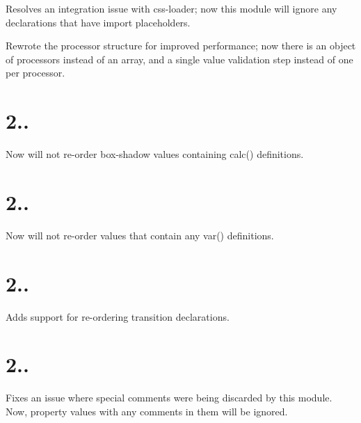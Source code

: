 
\begin{DoxyItemize}
\item Resolves an integration issue with css-\/loader; now this module will ignore any declarations that have import placeholders.
\item Rewrote the processor structure for improved performance; now there is an object of processors instead of an array, and a single value validation step instead of one per processor.
\end{DoxyItemize}

\section*{2..}


\begin{DoxyItemize}
\item Now will not re-\/order box-\/shadow values containing {\ttfamily calc()} definitions.
\end{DoxyItemize}

\section*{2..}


\begin{DoxyItemize}
\item Now will not re-\/order values that contain any {\ttfamily var()} definitions.
\end{DoxyItemize}

\section*{2..}


\begin{DoxyItemize}
\item Adds support for re-\/ordering {\ttfamily transition} declarations.
\end{DoxyItemize}

\section*{2..}


\begin{DoxyItemize}
\item Fixes an issue where special comments were being discarded by this module. Now, property values with any comments in them will be ignored.
\end{DoxyItemize}

